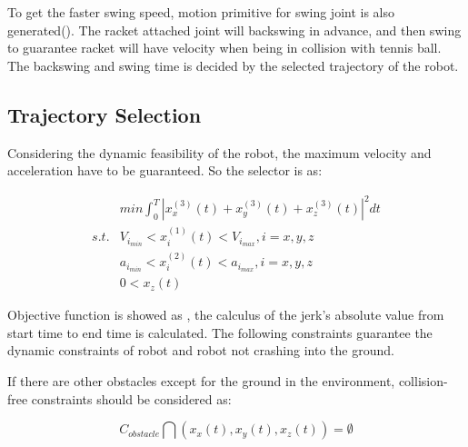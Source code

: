\documentclass{jarticle}
\begin{document}
To get the faster swing speed, motion primitive for swing joint is also generated(). The racket attached joint will backswing in advance, and then swing to guarantee racket will have velocity when being in collision with tennis ball. The backswing and swing time is decided by the selected trajectory of the robot.

\subsection{Trajectory Selection}
Considering the dynamic feasibility of the robot, the maximum velocity and acceleration have to be guaranteed. So the selector is as:

\begin{eqnarray}
  \label{eq:temp3}
 & min{\int_0^T |x^{(3)}_x(t) + x^{(3)}_y(t) + x^{(3)}_z(t)|^2 dt}   \\
  \label{eq:temp4}
s.t. &  V_{i_{min}} < x^{(1)}_i(t) < V_{i_{max}}, i = x, y, z \nonumber \\
  \label{eq:temp5}
 & a_{i_{min}} < x^{(2)}_i(t) < a_{i_{max}}, i = x, y, z \nonumber \\
  \label{eq:temp6}
 & 0 < x_z(t) \nonumber
\end{eqnarray}

Objective function is showed as , the calculus of the jerk’s absolute value from start time to end time is calculated. The following constraints guarantee the dynamic constraints of robot and robot not crashing into the ground.

If there are other obstacles except for the ground in the environment, collision-free constraints should be considered as:

\begin{equation}
  \label{eq:temp7}
  C_{obstacle}\bigcap (x_x(t), x_y(t), x_z(t)) =\emptyset
\end{equation}
\end{document}
